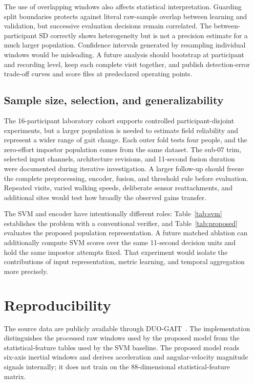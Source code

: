 \documentclass[conference]{IEEEtran}
\begin{document}
The use of overlapping windows also affects statistical interpretation. Guarding split boundaries protects against literal raw-sample overlap between learning and validation, but successive evaluation decisions remain correlated. The between-participant SD correctly shows heterogeneity but is not a precision estimate for a much larger population. Confidence intervals generated by resampling individual windows would be misleading. A future analysis should bootstrap at participant and recording level, keep each complete visit together, and publish detection-error trade-off curves and score files at predeclared operating points.

\subsection{Sample size, selection, and generalizability}
The 16-participant laboratory cohort supports controlled participant-disjoint experiments, but a larger population is needed to estimate field reliability and represent a wider range of gait change. Each outer fold tests four people, and the zero-effort impostor population comes from the same dataset. The sub-07 trim, selected input channels, architecture revisions, and 11-second fusion duration were documented during iterative investigation. A larger follow-up should freeze the complete preprocessing, encoder, fusion, and threshold rule before evaluation. Repeated visits, varied walking speeds, deliberate sensor reattachments, and additional sites would test how broadly the observed gains transfer.

The SVM and encoder have intentionally different roles: Table~\ref{tab:svm} establishes the problem with a conventional verifier, and Table~\ref{tab:proposed} evaluates the proposed population representation. A future matched ablation can additionally compute SVM scores over the same 11-second decision units and hold the same impostor attempts fixed. That experiment would isolate the contributions of input representation, metric learning, and temporal aggregation more precisely.

\section{Reproducibility}

The source data are publicly available through DUO-GAIT~\cite{Zhou2023}. The implementation distinguishes the processed raw windows used by the proposed model from the statistical-feature tables used by the SVM baseline. The proposed model reads six-axis inertial windows and derives acceleration and angular-velocity magnitude signals internally; it does not train on the 88-dimensional statistical-feature matrix.
\end{document}
